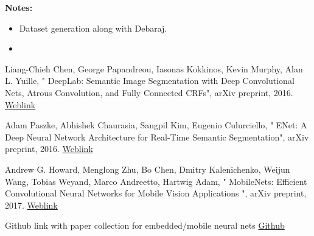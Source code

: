 \documentclass[14pt]{extarticle}
\begin{document}
\textbf{Notes:}
\begin{itemize}
	\item Dataset generation along with Debaraj.
	\item 
\end{itemize}

\begin{thebibliography}{9}

Liang-Chieh Chen, George Papandreou, Iasonas Kokkinos, Kevin Murphy, Alan L. Yuille, " DeepLab: Semantic Image Segmentation with Deep Convolutional Nets, Atrous Convolution, and Fully Connected CRFs", arXiv preprint, 2016. \href{https://arxiv.org/abs/1606.00915}{Weblink}

Adam Paszke, Abhishek Chaurasia, Sangpil Kim, Eugenio Culurciello, " ENet: A Deep Neural Network Architecture for Real-Time Semantic Segmentation", arXiv preprint, 2016. \href{https://arxiv.org/abs/1606.02147}{Weblink}

Andrew G. Howard, Menglong Zhu, Bo Chen, Dmitry Kalenichenko, Weijun Wang, Tobias Weyand, Marco Andreetto, Hartwig Adam, " MobileNets: Efficient Convolutional Neural Networks for Mobile Vision Applications ", arXiv preprint, 2017. \href{https://arxiv.org/abs/1704.04861}{Weblink}
 
Github link with paper collection for embedded/mobile neural nets \href{https://github.com/csarron/emdl}{Github}

\end{thebibliography}
\end{document}
